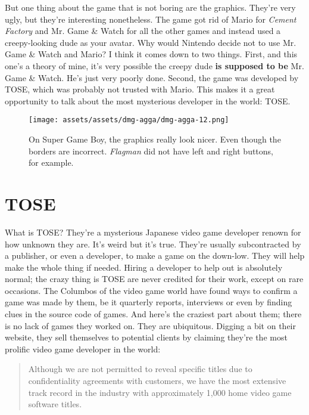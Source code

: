 \documentclass{book}
\begin{document}
But one thing about the game that is not boring are the graphics. They’re very ugly, but they’re interesting nonetheless. The game got rid of Mario for \emph{Cement Factory} and Mr. Game \& Watch for all the other games and instead used a creepy-looking dude as your avatar. Why would Nintendo decide not to use Mr. Game \& Watch and Mario? I think it comes down to two things. First, and this one’s a theory of mine, it’s very possible the creepy dude \textbf{is supposed to be} Mr. Game \& Watch. He’s just very poorly done. Second, the game was developed by TOSE, which was probably not trusted with Mario. This makes it a great opportunity to talk about the most mysterious developer in the world: TOSE.

\begin{figure}[hbt]
\vskip 10pt
\centering \texttt{[image: assets/assets/dmg-agga/dmg-agga-12.png]}\par\pagetwodescription On Super Game Boy, the graphics really look nicer. Even though the borders are incorrect. \emph{Flagman} did not have left and right buttons, for example.
\vskip 6pt
\end{figure}

\FloatBarrier\needspace{10mm}\section*{TOSE}\nopagebreak[4]

What is TOSE? They’re a mysterious Japanese video game developer renown for how unknown they are. It’s weird but it’s true. They’re usually subcontracted by a publisher, or even a developer, to make a game on the down-low. They will help make the whole thing if needed. Hiring a developer to help out is absolutely normal; the crazy thing is TOSE are never credited for their work, except on rare occasions. The Columbos of the video game world have found ways to confirm a game was made by them, be it quarterly reports, interviews or even by finding clues in the source code of games. And here’s the craziest part about them; there is no lack of games they worked on. They are ubiquitous. Digging a bit on their website, they sell themselves to potential clients by claiming they’re the most prolific video game developer in the world:

\begin{quote}
Although we are not permitted to reveal specific titles due to confidentiality agreements with customers, we have the most extensive track record in the industry with approximately 1,000 home video game software titles.
\end{quote} \par
\end{document}
